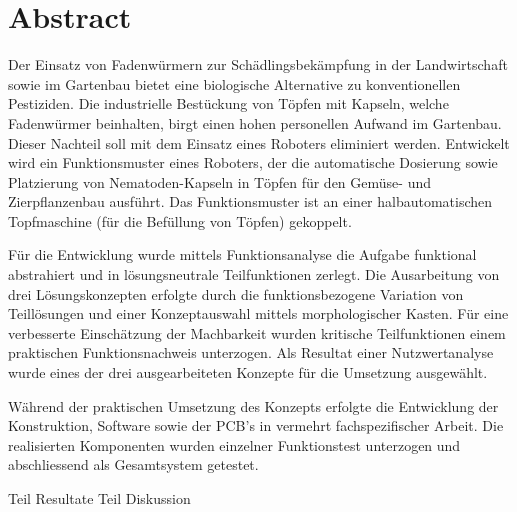 \newpage
\section{Abstract}
Der Einsatz von Fadenwürmern zur Schädlingsbekämpfung in der Landwirtschaft sowie im Gartenbau bietet eine biologische Alternative zu konventionellen Pestiziden. Die industrielle Bestückung von Töpfen mit Kapseln, welche Fadenwürmer beinhalten, birgt einen hohen personellen Aufwand im Gartenbau. Dieser Nachteil soll mit dem Einsatz eines Roboters eliminiert werden. Entwickelt wird ein Funktionsmuster eines Roboters, der die automatische Dosierung sowie Platzierung von Nematoden-Kapseln in Töpfen für den Gemüse- und Zierpflanzenbau ausführt. Das Funktionsmuster ist an einer halbautomatischen Topfmaschine (für die Befüllung von Töpfen) gekoppelt.
\newline

Für die Entwicklung wurde mittels Funktionsanalyse die Aufgabe funktional abstrahiert und in lösungsneutrale Teilfunktionen zerlegt. Die Ausarbeitung von drei Lösungskonzepten erfolgte durch die funktionsbezogene Variation von Teillösungen und einer Konzeptauswahl mittels morphologischer Kasten. Für eine verbesserte Einschätzung der Machbarkeit wurden kritische Teilfunktionen einem praktischen Funktionsnachweis unterzogen. Als Resultat einer Nutzwertanalyse wurde eines der drei ausgearbeiteten Konzepte für die Umsetzung ausgewählt. 
\newline

Während der praktischen Umsetzung des Konzepts erfolgte die Entwicklung der Konstruktion, Software sowie der PCB’s in vermehrt fachspezifischer Arbeit. Die realisierten Komponenten wurden einzelner Funktionstest unterzogen und abschliessend als Gesamtsystem getestet.
\newline

Teil Resultate
\newline
Teil Diskussion

